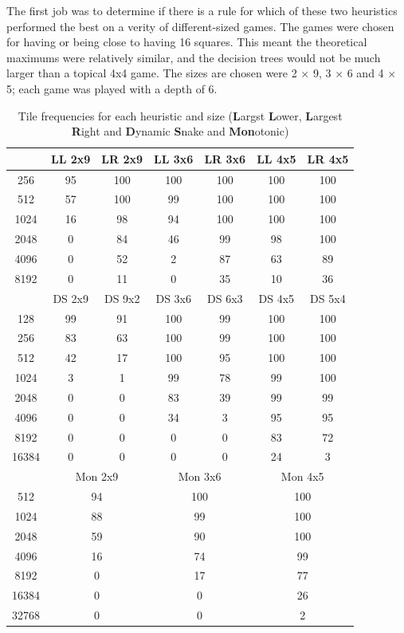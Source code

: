 \documentclass{article}
\begin{document}
The first job was to determine if there is a rule for which of these two heuristics performed the best on a verity of different-sized games. The games were chosen for having or being close to having 16 squares. This meant the theoretical maximums were relatively similar, and the decision trees would not be much larger than a topical 4x4 game. The sizes are chosen were 2 × 9, 3 × 6 and 4 × 5; each game was played with a depth of 6.
\begin{table}
    \centering
\begin{tabular}{|c|cccccc|}
\hline
&LL 2x9&LR 2x9&LL 3x6&LR 3x6&LL 4x5&LR 4x5\\
\hline
256&95&100&100&100&100&100\\
512&57&100&99&100&100&100\\
1024&16&98&94&100&100&100\\
2048&0&84&46&99&98&100\\
4096&0&52&2&87&63&89\\
8192&0&11&0&35&10&36\\
\hline
&DS 2x9&DS 9x2&DS 3x6&DS 6x3&DS 4x5&DS 5x4\\
\hline
128&99&91&100&99&100&100\\
256&83&63&100&99&100&100\\
512&42&17&100&95&100&100\\
1024&3&1&99&78&99&100\\
2048&0&0&83&39&99&99\\
4096&0&0&34&3&95&95\\
8192&0&0&0&0&83&72\\
16384&0&0&0&0&24&3\\
\hline
&\multicolumn{2}{c}{Mon 2x9}&\multicolumn{2}{c}{Mon 3x6}&\multicolumn{2}{c|}{Mon 4x5}\\
\hline
512&\multicolumn{2}{c}{94}&\multicolumn{2}{c}{100}&\multicolumn{2}{c|}{100}\\
1024&\multicolumn{2}{c}{88}&\multicolumn{2}{c}{99}&\multicolumn{2}{c|}{100}\\
2048&\multicolumn{2}{c}{59}&\multicolumn{2}{c}{90}&\multicolumn{2}{c|}{100}\\
4096&\multicolumn{2}{c}{16}&\multicolumn{2}{c}{74}&\multicolumn{2}{c|}{99}\\
8192&\multicolumn{2}{c}{0}&\multicolumn{2}{c}{17}&\multicolumn{2}{c|}{77}\\
16384&\multicolumn{2}{c}{0}&\multicolumn{2}{c}{0}&\multicolumn{2}{c|}{26}\\
32768&\multicolumn{2}{c}{0}&\multicolumn{2}{c}{0}&\multicolumn{2}{c|}{2}\\
\hline
\end{tabular}
    \caption{Tile frequencies for each heuristic and size (\textbf{L}argst \textbf{L}ower,  \textbf{L}argest \textbf{R}ight and \textbf{D}ynamic \textbf{S}nake and \textbf{Mon}otonic)}
    \label{tab:LLLR}
\end{table}
\end{document}
